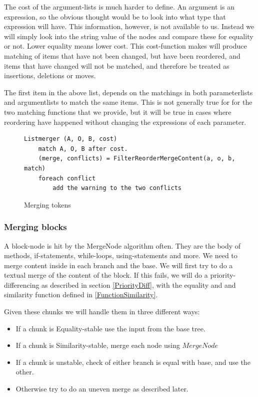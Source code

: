 \documentclass[11pt]{article}
\begin{document}
The cost of the argument-lists is much harder to define. An argument is an expression, so the obvious thought would be to look into what type that expression will have. This information, however, is not available to us. Instead we will simply look into the string value of the nodes and compare these for equality or not. Lower equality means lower cost. This cost-function makes will produce matching of items that have not been changed, but have been reordered, and items that have changed will not be matched, and therefore be treated as insertions, deletions or moves.

The first item in the above list, depends on the matchings in both parameterlists and argumentlists to match the same items. This is not generally true for for the two matching functions that we provide, but it will be true in cases where reordering have happened without changing the expressions of each parameter.

\begin{figure}
  \caption{Merging tokens}
  \label{Listmerger}
\begin{verbatim}
Listmerger (A, O, B, cost)
    match A, O, B after cost.
    (merge, conflicts) = FilterReorderMergeContent(a, o, b, match)
    foreach conflict
        add the warning to the two conflicts

\end{verbatim}
\end{figure}

\subsubsection{Merging blocks}
A block-node is hit by the MergeNode algorithm often. They are the body of methods, if-statements, while-loops, using-statements and more. We need to merge content inside in each branch and the base. We will first try to do a textual merge of the content of the block. If this fails, we will do a priority-differencing as described in section \ref{PriorityDiff}, with the equality and and similarity function defined in \ref{FunctionSimilarity}.

Given these chunks we will handle them in three different ways: 

\begin{itemize}
	\item If a chunk is Equality-stable use the input from the base tree.
	\item If a chunk is Similarity-stable, merge each node using $MergeNode$
	\item If a chunk is unstable, check of either branch is equal with base, and use the other.
	\item Otherwise try to do an uneven merge as described later.
\end{itemize}
\end{document}
